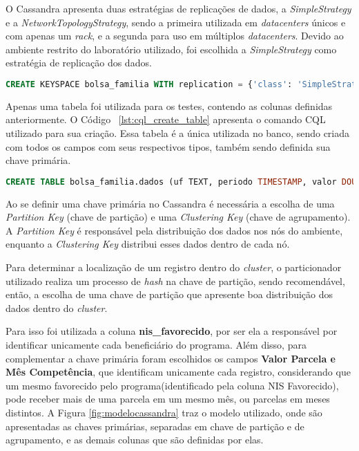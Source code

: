 O Cassandra apresenta duas estratégias de replicações de dados, a \emph{SimpleStrategy} e a \emph{NetworkTopologyStrategy}, sendo a primeira utilizada em \emph{datacenters} únicos e com apenas um \emph{rack}, e a segunda para uso em múltiplos \emph{datacenters}. Devido ao ambiente restrito do laboratório utilizado, foi escolhida a \emph{SimpleStrategy} como estratégia de replicação dos dados.

\noindent
\begin{minipage}[c]{1\textwidth}
\begin{lstlisting}[caption={Código CQL para criação do keyspace},label={lst:cql_create_keyspace},language=SQL]
CREATE KEYSPACE bolsa_familia WITH replication = {'class': 'SimpleStrategy', 'replication_factor': 1};
\end{lstlisting}
\end{minipage}

Apenas uma tabela foi utilizada para os testes, contendo as colunas definidas anteriormente. O Código ~\ref{lst:cql_create_table} apresenta o comando CQL utilizado para sua criação. Essa tabela é a única utilizada no banco, sendo criada com todos os campos com seus respectivos tipos, também sendo definida sua chave primária.

\noindent
\begin{minipage}[c]{1\textwidth}
	\begin{lstlisting}[caption={Código CQL para criação da tabela},label={lst:cql_create_table},language=SQL]
	CREATE TABLE bolsa_familia.dados (uf TEXT, periodo TIMESTAMP, valor DOUBLE, nis_favorecido BIGINT, cod_municipio INT, fonte TEXT, nome_favorecido TEXT, nome_municipio TEXT, PRIMARY KEY(nis_favorecido, periodo, valor));
	\end{lstlisting}
\end{minipage}

Ao se definir uma chave primária no Cassandra é necessária a escolha de uma \emph{Partition Key} (chave de partição) e uma \emph{Clustering Key} (chave de agrupamento). A \emph{Partition Key} é responsável pela distribuição dos dados nos nós do ambiente, enquanto a \emph{Clustering Key} distribui esses dados dentro de cada nó.

Para determinar a localização de um registro dentro do \emph{cluster}, o particionador utilizado realiza um processo de \emph{hash} na chave de partição, sendo recomendável, então, a escolha de uma chave de partição que apresente boa distribuição dos dados dentro do \emph{cluster}. 

Para isso foi utilizada a coluna \textbf{nis\_favorecido}, por ser ela a responsável por identificar unicamente cada beneficiário do programa. Além disso, para complementar a chave primária foram escolhidos os campos \textbf{Valor Parcela e Mês Competência}, que identificam unicamente cada registro, considerando que um mesmo favorecido pelo programa(identificado pela coluna NIS Favorecido), pode receber mais de uma parcela em um mesmo mês, ou parcelas em meses distintos. A Figura \ref{fig:modelocassandra} traz o modelo utilizado, onde são apresentadas as chaves primárias, separadas em chave de partição e de agrupamento, e as demais colunas que são definidas por elas.

